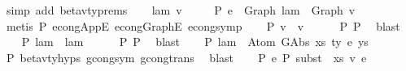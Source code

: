 \begin{isabellebody}
\ {\isacharparenleft}{\kern0pt}simp\ add{\isacharcolon}{\kern0pt}\ beta{\isacharunderscore}{\kern0pt}v{\isacharunderscore}{\kern0pt}ty{\isachardot}{\kern0pt}prems{\isacharparenright}{\kern0pt}\isanewline
\isanewline
\ \ \isamarkupfalse%
\ lam{\isacharprime}{\kern0pt}\ v{\isacharprime}{\kern0pt}\ \isanewline
\ \ \ \ P{}{\isacharcolon}{\kern0pt}\ {\isachardoublequoteopen}e{}{\isacharprime}{\kern0pt}\ {\isacharequal}{\kern0pt}\ Graph\ lam{\isacharprime}{\kern0pt}\ {\isasymcdot}\ Graph\ v{\isacharprime}{\kern0pt}{\isachardoublequoteclose}\isanewline
\ \ \isamarkupfalse%
\ {\isacharparenleft}{\kern0pt}metis\ P{}\ econg{\isacharunderscore}{\kern0pt}AppE\ econg{\isacharunderscore}{\kern0pt}GraphE\ econg{\isacharunderscore}{\kern0pt}symp{\isacharparenright}{\kern0pt}\isanewline
\isanewline
\ \ \isamarkupfalse%
\ P{}{\isacharcolon}{\kern0pt}\ {\isachardoublequoteopen}v\ {\isasymsimeq}\ v{\isacharprime}{\kern0pt}{\isachardoublequoteclose}\isanewline
\ \ \ \ \isamarkupfalse%
\ P{}\ P{}\ \isamarkupfalse%
\ blast\isanewline
\isanewline
\ \ \isamarkupfalse%
\ P{}{\isacharcolon}{\kern0pt}\ {\isachardoublequoteopen}lam\ {\isasymsimeq}\ lam{\isacharprime}{\kern0pt}{\isachardoublequoteclose}\isanewline
\ \ \ \ \isamarkupfalse%
\ P{}\ P{}\ \isamarkupfalse%
\ blast\isanewline
\isanewline
\ \ \isamarkupfalse%
\ P{}{\isacharcolon}{\kern0pt}\ {\isachardoublequoteopen}lam{\isacharprime}{\kern0pt}\ {\isasymsimeq}\ Atom\ {\isacharparenleft}{\kern0pt}GAbs\ xs\ ty\ e{\isacharparenright}{\kern0pt}\ ys{\isachardoublequoteclose}\isanewline
\ \ \ \ \isamarkupfalse%
\ P{}\ beta{\isacharunderscore}{\kern0pt}v{\isacharunderscore}{\kern0pt}ty{\isachardot}{\kern0pt}hyps{\isacharparenleft}{\kern0pt}{}{\isacharparenright}{\kern0pt}\ gcong{\isachardot}{\kern0pt}sym\ gcong{\isachardot}{\kern0pt}trans\ \isamarkupfalse%
\ blast\isanewline
\isanewline
\ \ \isamarkupfalse%
\ P{}{\isacharcolon}{\kern0pt}\ {\isachardoublequoteopen}e{}{\isacharprime}{\kern0pt}\ {\isacharminus}{\kern0pt}{\isachargreater}{\kern0pt}{\isacharbraceleft}{\kern0pt}P{\isacharbraceright}{\kern0pt}\ subst\ {}\ xs\ v{\isacharprime}{\kern0pt}\ e{\isachardoublequoteclose}\isanewline
\ \ \ \ \isamarkupfalse%

\end{isabellebody}
